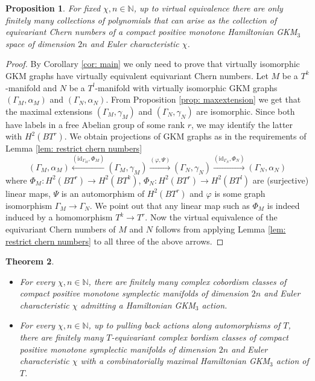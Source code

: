 \documentclass[12pt,a4paper]{amsart}
\newcommand{\NN}{\mathbb{N}}
\newtheorem{thm}{Theorem}[section]
\newtheorem{prop}[thm]{Proposition}
\theoremstyle{plain}
\theoremstyle{definition}
\begin{document}
\begin{prop}\label{fin many equiv Chern numbers}
For fixed $\chi,n\in \NN$, up to virtual equivalence there are only finitely
many collections of polynomials that can arise as the
collection of equivariant Chern numbers
of a compact positive monotone Hamiltonian GKM$_3$ space of dimension $2n$ and Euler characteristic $\chi$.
\end{prop}
\begin{proof}
By Corollary \ref{cor: main} we only need to prove that virtually isomorphic GKM graphs have virtually equivalent equivariant Chern numbers. Let $M$ be a $T^k$-manifold and $N$ be a $T^l$-manifold with virtually isomorphic GKM graphs $(\Gamma_M,\alpha_M)$ and $(\Gamma_N,\alpha_N)$. 
From Proposition \ref{prop: maxextension} we get that the maximal extensions
$(\Gamma_M,\gamma_M)$ and $(\Gamma_N,\gamma_N)$ are isomorphic. Since both have labels in
a free Abelian group of some rank $r$, we may identify the latter with $H^2(BT^r)$. We obtain
projections of GKM graphs as in the requirements of Lemma \ref{lem:
restrict chern numbers}
\[(\Gamma_M,\alpha_M)\xleftarrow{(\mathrm{id}_{\Gamma_M},\Phi_M)} (\Gamma_M,\gamma_M)\xrightarrow{(\varphi,\Psi)} (\Gamma_N,\gamma_N)\xrightarrow{(\mathrm{id}_{\Gamma_N},\Phi_N)} (\Gamma_N,\alpha_N)\]
where $\Phi_M\colon H^2(BT^r)\rightarrow H^2(BT^k)$, $\Phi_N\colon H^2(BT^r)\rightarrow H^2(BT^l)$ are (surjective) linear maps, $\Psi$ is an automorphism of $H^2(BT^r)$ and $\varphi$ is some graph isomorphism $\Gamma_M\rightarrow \Gamma_N$. We point out that any linear map such as $\Phi_M$ is indeed induced by a homomorphism $T^k\rightarrow T^r$. Now the virtual equivalence of the equivariant Chern numbers of $M$ and $N$ follows from applying Lemma \ref{lem: restrict chern numbers} to all three of the above arrows.
\end{proof}


\begin{thm}\label{thm: bordism} 
$\;$\\\vspace{-0.3cm}
\begin{itemize}[leftmargin=*]
\item[(i)] For every $\chi,n\in \NN$, there are finitely many complex cobordism classes of compact positive monotone symplectic manifolds of dimension $2n$ and Euler characteristic $\chi$ admitting a Hamiltonian GKM$_3$ action. 
\item[(ii)] For every $\chi,n\in \NN$, up to pulling back actions along automorphisms of $T$, there are finitely many $T$-equivariant complex bordism classes of compact positive monotone symplectic manifolds of dimension $2n$ and Euler characteristic $\chi$ with a combinatorially maximal Hamiltonian GKM$_3$ action of $T$.
\end{itemize}
\end{thm}
\end{document}
